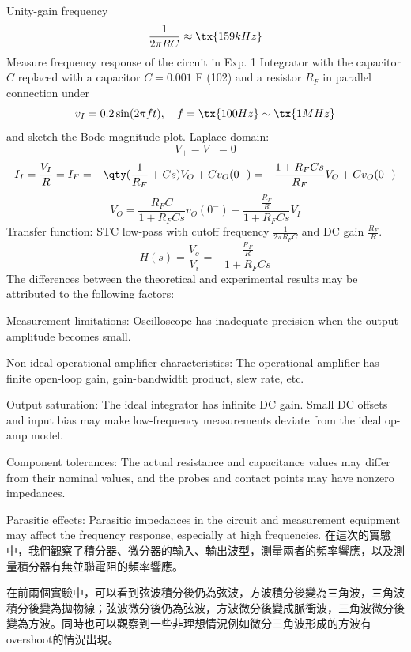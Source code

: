 \documentclass[a4paper,12pt]{article}
\begin{document}
Unity-gain frequency
\[\frac{1}{2\pi RC}\approx\tx{159 kHz}\]
Measure frequency response of the circuit in Exp. 1 Integrator with the capacitor $C$ replaced with a capacitor $C=0.001$ \textmu{}F (102) and a resistor $R_F$ in parallel connection under
\[v_I=0.2\sin(2\pi ft),\quad f=\tx{100 Hz}\sim\tx{1 MHz}\]
and sketch the Bode magnitude plot.
Laplace domain:
\[V_+=V_-=0\]
\[I_I=\frac{V_I}{R}=I_F=-\qty(\frac{1}{R_F}+Cs)V_O+Cv_O(0^-)=-\frac{1+R_FCs}{R_F}V_O+Cv_O(0^-)\]
\[V_O=\frac{R_FC}{1+R_FCs}v_O(0^-)-\frac{\frac{R_F}{R}}{1+R_FCs}V_I\]
Transfer function: STC low-pass with cutoff frequency $\frac{1}{2\pi R_FC}$ and DC gain $\frac{R_F}{R}$.
\[H(s)=\frac{V_o}{V_i}=-\frac{\frac{R_F}{R}}{1+R_FCs}\]
The differences between the theoretical and experimental results may be attributed to the following factors:
\bit
\item Measurement limitations: Oscilloscope has inadequate precision when the output amplitude becomes small.
\item Non-ideal operational amplifier characteristics: The operational amplifier has finite open-loop gain, gain-bandwidth product, slew rate, etc.
\item Output saturation: The ideal integrator has infinite DC gain. Small DC offsets and input bias may make low-frequency measurements deviate from the ideal op-amp model.
\item Component tolerances: The actual resistance and capacitance values may differ from their nominal values, and the probes and contact points may have nonzero impedances.
\item Parasitic effects: Parasitic impedances in the circuit and measurement equipment may affect the frequency response, especially at high frequencies.
\eit
{}
在這次的實驗中，我們觀察了積分器、微分器的輸入、輸出波型，測量兩者的頻率響應，以及測量積分器有無並聯電阻的頻率響應。

在前兩個實驗中，可以看到弦波積分後仍為弦波，方波積分後變為三角波，三角波積分後變為拋物線；弦波微分後仍為弦波，方波微分後變成脈衝波，三角波微分後變為方波。同時也可以觀察到一些非理想情況例如微分三角波形成的方波有overshoot的情況出現。
\end{document}
